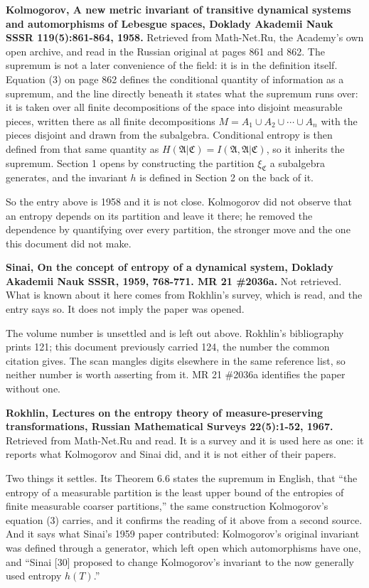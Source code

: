 \textbf{Kolmogorov, A new metric invariant of transitive dynamical systems and automorphisms of Lebesgue spaces, Doklady Akademii Nauk SSSR 119(5):861-864, 1958.} Retrieved from Math-Net.Ru, the Academy's own open archive, and read in the Russian original at pages 861 and 862. The supremum is not a later convenience of the field: it is in the definition itself. Equation (3) on page 862 defines the conditional quantity of information as a supremum, and the line directly beneath it states what the supremum runs over: it is taken over all finite decompositions of the space into disjoint measurable pieces, written there as all finite decompositions \(M = A_1 \cup A_2 \cup \cdots \cup A_n\) with the pieces disjoint and drawn from the subalgebra. Conditional entropy is then defined from that same quantity as \(H(\mathfrak{A}|\mathfrak{C}) = I(\mathfrak{A}, \mathfrak{A}|\mathfrak{C})\), so it inherits the supremum. Section 1 opens by constructing the partition \(\xi_{\mathfrak{C}}\) a subalgebra generates, and the invariant \(h\) is defined in Section 2 on the back of it.

So the entry above is 1958 and it is not close. Kolmogorov did not observe that an entropy depends on its partition and leave it there; he removed the dependence by quantifying over every partition, the stronger move and the one this document did not make.

\textbf{Sinai, On the concept of entropy of a dynamical system, Doklady Akademii Nauk SSSR, 1959, 768-771. MR 21 \#2036a.} Not retrieved. What is known about it here comes from Rokhlin's survey, which is read, and the entry says so. It does not imply the paper was opened.

The volume number is unsettled and is left out above. Rokhlin's bibliography prints 121; this document previously carried 124, the number the common citation gives. The scan mangles digits elsewhere in the same reference list, so neither number is worth asserting from it. MR 21 \#2036a identifies the paper without one.

\textbf{Rokhlin, Lectures on the entropy theory of measure-preserving transformations, Russian Mathematical Surveys 22(5):1-52, 1967.} Retrieved from Math-Net.Ru and read. It is a survey and it is used here as one: it reports what Kolmogorov and Sinai did, and it is not either of their papers.

Two things it settles. Its Theorem 6.6 states the supremum in English, that ``the entropy of a measurable partition is the least upper bound of the entropies of finite measurable coarser partitions,'' the same construction Kolmogorov's equation (3) carries, and it confirms the reading of it above from a second source. And it says what Sinai's 1959 paper contributed: Kolmogorov's original invariant was defined through a generator, which left open which automorphisms have one, and ``Sinai [30] proposed to change Kolmogorov's invariant to the now generally used entropy $h(T)$.''

